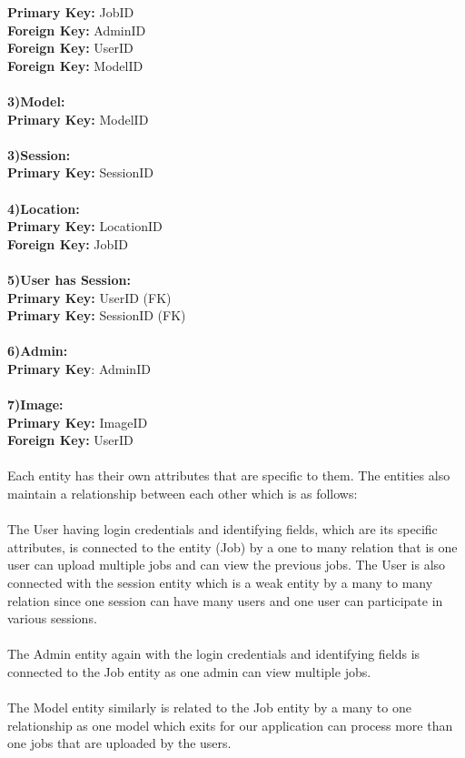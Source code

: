 \textbf{Primary Key:} JobID\\
\textbf{Foreign Key:} AdminID\\
\textbf{Foreign Key:} UserID\\
\textbf{Foreign Key:} ModelID\\
\\
\textbf{3)Model:}\\
\textbf{Primary Key:} ModelID\\
\\
\textbf{3)Session:}\\
\textbf{Primary Key:} SessionID\\
\\
\textbf{4)Location:}\\
\textbf{Primary Key:} LocationID\\
\textbf{Foreign Key:} JobID\\
\\
\textbf{5)User has Session:}\\
\textbf{Primary Key:} UserID (FK)\\
\textbf{Primary Key:} SessionID (FK)\\
\\
\textbf{6)Admin:}\\
\textbf{Primary Key}: AdminID\\
\\
\textbf{7)Image:}\\
\textbf{Primary Key:} ImageID\\
\textbf{Foreign Key:} UserID\\
\\
Each entity has their own attributes that are specific to them. The entities also maintain a relationship between each other which is as follows:\\
\\
The User having login credentials and identifying fields, which are its specific attributes, is connected to the entity (Job) by a one to many relation that is one user can upload multiple jobs and can view the previous jobs. The User is also connected with the session entity which is a weak entity by a many to many relation since one session can have many users and one user can participate in various sessions.\\
\\
The Admin entity again with the login credentials and identifying fields is connected to the Job entity as one admin can view multiple jobs.\\
\\
The Model entity similarly is related to the Job entity by a many to one relationship as one model which exits for our application can process more than one jobs that are uploaded by the users.\\
